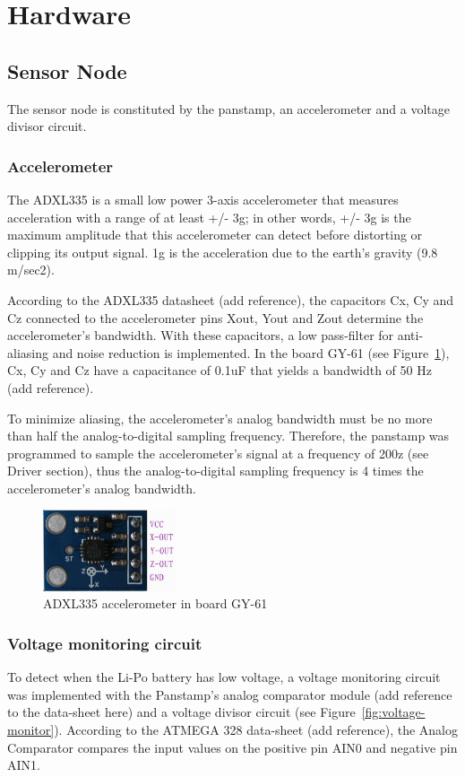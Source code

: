 \section{Hardware}
\subsection{Sensor Node}
The sensor node is constituted by the panstamp, an accelerometer and a voltage divisor circuit.

\subsubsection{Accelerometer}
The ADXL335 is a small low power 3-axis accelerometer that measures acceleration with a range of at least +/- 3g; in other words, +/- 3g is the maximum amplitude that this accelerometer can detect before distorting or clipping its output signal. 1g is the acceleration due to the earth's gravity (9.8 m/sec2).

According to the ADXL335 datasheet (add reference), the capacitors Cx, Cy and Cz connected to the accelerometer pins Xout, Yout and Zout determine the accelerometer's bandwidth. With these capacitors, a low pass-filter for anti-aliasing and noise reduction is implemented. In the board GY-61 (see Figure~\ref{fig:accelerometer}), Cx, Cy and Cz have a capacitance of 0.1uF that yields a bandwidth of 50 Hz (add reference). 	

To minimize aliasing, the accelerometer's analog bandwidth must be no more than half the analog-to-digital sampling frequency. Therefore, the panstamp was programmed to sample the accelerometer's signal at a frequency of 200z (see Driver section), thus the analog-to-digital sampling frequency is 4 times the accelerometer's analog bandwidth. 

\begin{figure}[h!] 
 \centering
 \includegraphics[width= 0.35\textwidth, clip=true,keepaspectratio=true]
 {./pic/accelerometer.png}
 \caption{ADXL335 accelerometer in board GY-61}
 \label{fig:accelerometer}
\end{figure}  
    
  
\subsubsection{Voltage monitoring circuit}
To detect when the Li-Po battery has low voltage, a voltage monitoring circuit was implemented with the Panstamp's analog comparator module (add reference to the data-sheet here) and a voltage divisor circuit (see Figure~\ref{fig:voltage-monitor}). According to the ATMEGA 328 data-sheet (add reference), the Analog Comparator compares the input values on the positive pin AIN0 and negative pin AIN1. 

